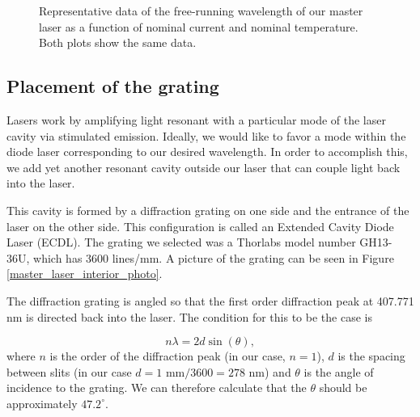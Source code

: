 \begin{figure}
\begin{subfigure}[b]{0.40\textwidth}
\label{currentandT:sfigb}
\end{subfigure}
\caption[Wavelength vs temperature and current]{\label{3dCurrentandTgraph} Representative data of the free-running wavelength of our master laser as a function of nominal current and nominal temperature. Both plots show the same data.}
\end{figure}



\subsection{Placement of the grating}



Lasers work by amplifying light resonant with a particular mode of the laser cavity via stimulated emission. Ideally, we would like to favor a mode within the diode laser corresponding to our desired wavelength. In order to accomplish this, we add yet another resonant cavity outside our laser that can couple light back into the laser. 

This cavity is formed by a diffraction grating on one side and the entrance of the laser on the other side. This configuration is called an Extended Cavity Diode Laser (ECDL). The grating we selected was a Thorlabs model number GH13-36U, which has 3600 lines/mm. A picture of the grating can be seen in Figure\,\ref{master_laser_interior_photo}. 

The diffraction grating is angled so that the first order diffraction peak at 407.771 nm is directed back into the laser. The condition for this to be the case is 

\begin{equation} \label{gratingEQn}
n \lambda = 2 d \sin (\theta),
\end{equation}
where $n$ is the order of the diffraction peak (in our case, $n=1$), $d$ is the spacing between slits (in our case $d=1$ mm$/3600 = 278 $ nm) and $\theta$ is the angle of incidence to the grating. We can therefore calculate that the $\theta$ should be approximately
\href{http://www.wolframalpha.com/input/?i=arcsin%28+407.771+nm+%2F%282*%281+mm%2F3600%29%29%29+in+degrees}{$47.2^\circ$}.

